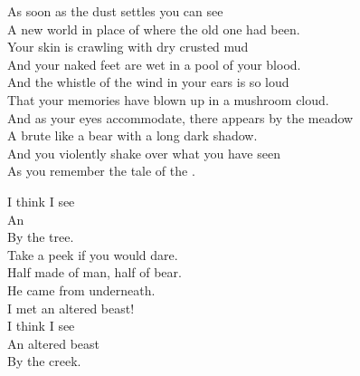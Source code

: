 
\label{album:murder-of-the-universe}





As soon as the dust settles you can see \\
A new world in place of where the old one had been. \\

Your skin is crawling with dry crusted mud \\
And your naked feet are wet in a pool of your blood. \\

And the whistle of the wind in your ears is so loud \\
That your memories have blown up in a mushroom cloud. \\

And as your eyes accommodate, there appears by the meadow \\
A brute like a bear with a long dark shadow. \\

And you violently shake over what you have seen \\
As you remember the tale of the . \\





I think I see \\
An  \\
By the tree. \\

Take a peek if you would dare. \\
Half made of man, half of bear. \\

He came from underneath. \\
I met an altered beast! \\

I think I see \\
An altered beast \\
By the creek. \\

